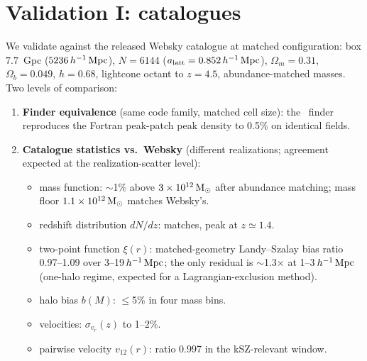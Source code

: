 \section{Validation I: catalogues}
\label{sec:valcat}


We validate against the released Websky catalogue \citep{Stein2020} at
matched configuration: box $7.7$~Gpc ($5236\,h^{-1}\,\mathrm{Mpc}$), $N=6144$
($a_{\rm latt}=0.852\,h^{-1}\,\mathrm{Mpc}$), $\Omega_m=0.31$, $\Omega_b=0.049$, $h=0.68$,
lightcone octant to $z=4.5$, abundance-matched masses. Two levels of
comparison:

\begin{enumerate}
  \item \textbf{Finder equivalence} (same code family, matched cell size):
  the \ppjl\ finder reproduces the Fortran peak-patch peak density to 0.5\%
  on identical fields. 
  \item \textbf{Catalogue statistics vs.\ Websky} (different realizations;
  agreement expected at the realization-scatter level):
  \begin{itemize}
    \item mass function: $\sim$1\% above $3\times10^{12}\,\mathrm{M}_\odot$ after
    abundance matching; mass floor $1.1\times10^{12}\,\mathrm{M}_\odot$ matches
    Websky's. 
    \item redshift distribution $dN/dz$: matches, peak at $z\simeq1.4$.
    \item two-point function $\xi(r)$: matched-geometry Landy--Szalay bias
    ratio 0.97--1.09 over 3--19$\,h^{-1}\,\mathrm{Mpc}$; the only residual is
    $\sim$1.3$\times$ at 1--3$\,h^{-1}\,\mathrm{Mpc}$ (one-halo regime, expected for a
    Lagrangian-exclusion method).
    \item halo bias $b(M)$: $\le$5\% in four mass bins.
    \item velocities: $\sigma_{v_r}(z)$ to 1--2\%.
    \item pairwise velocity $v_{12}(r)$: ratio 0.997 in the kSZ-relevant
    window. 
  \end{itemize}
\end{enumerate}

